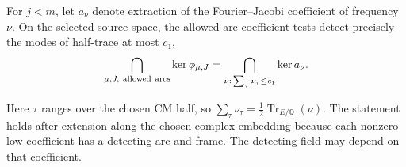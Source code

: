 \begin{proposition}
\label{prop:cm-low-mode-detector}
For \(j<m\), let \(a_\nu\) denote extraction of the Fourier--Jacobi coefficient of frequency \(\nu\). On the selected source space, the allowed arc coefficient tests detect precisely the modes of half-trace at most \(c_1\),
\[
 \bigcap_{\mu,J,\ {\rm allowed\ arcs}}\ker\phi_{\mu,J}=\bigcap_{\nu:\,\sum_\tau\nu_\tau\le c_1}\ker a_\nu.
\]

Here \(\tau\) ranges over the chosen CM half, so
\(\sum_\tau\nu_\tau=\tfrac12\operatorname{Tr}_{E/\mathbb Q}(\nu)\).
The statement holds after extension along the chosen complex
embedding because each nonzero low coefficient has a detecting arc
and frame. The detecting field may depend on that coefficient.
\end{proposition}

